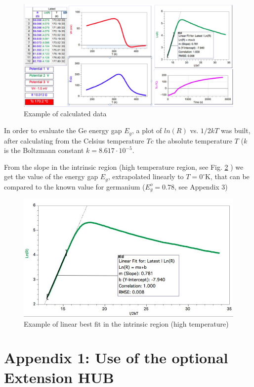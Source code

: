\documentclass[]{book}
\begin{document}
\begin{figure}

{\centering \includegraphics[width=0.65\linewidth]{Assets/Figures/example} 

}

\caption{Example of calculated data}\label{fig:Example}
\end{figure}

In order to evaluate the Ge energy gap \(E_g\), a plot of \(ln(R)\) vs.
\(1/2kT\) was built, after calculating from the Celsius temperature
\(Tc\) the absolute temperature \(T\) (\(k\) is the Boltzmann constant
\(k = 8.617 \cdot 10^{-5}\).

From the slope in the intrinsic region (high temperature region, see
Fig. \ref{fig:EgFit} ) we get the value of the energy gap \(E_g\),
extrapolated linearly to \(T=0^{\circ}\mathrm{K}\), that can be compared
to the known value for germanium (\(E_g^o=0.78\), see Appendix 3)

\begin{figure}

{\centering \includegraphics[width=0.65\linewidth]{Assets/Figures/ImageEgFit} 

}

\caption{Example of linear best fit in the intrinsic region (high temperature)}\label{fig:EgFit}
\end{figure}

\chapter{Appendix 1: Use of the optional Extension
HUB}\label{appendix-1-use-of-the-optional-extension-hub}
\end{document}
